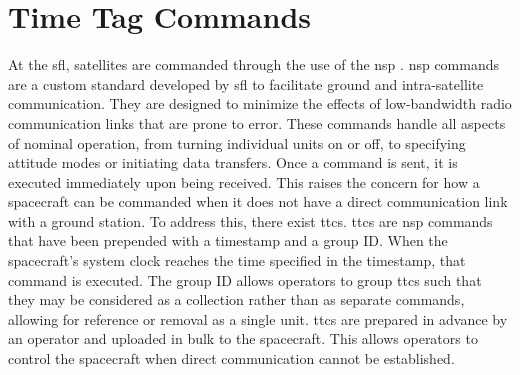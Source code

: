 \section{Time Tag Commands}

At the \gls{sfl}, satellites are commanded through the use of the \gls{nsp}
\cite{kekez_nanosatellite_2010}.  \gls{nsp} commands are a custom standard
developed by \gls{sfl} to facilitate ground and intra-satellite communication.
They are designed to minimize the effects of low-bandwidth radio communication
links that are prone to error.  These commands handle all aspects of nominal
operation, from turning individual units on or off, to specifying attitude
modes or initiating data transfers.  Once a command is sent, it is executed
immediately upon being received. This raises the concern for how a spacecraft
can be commanded when it does not have a direct communication link with a
ground station. To address this, there exist \glspl{ttc}.  \glspl{ttc} are
\gls{nsp} commands that have been prepended with a timestamp and a group ID.
When the spacecraft’s system clock reaches the time specified in the timestamp,
that command is executed.  The group ID allows operators to group \glspl{ttc}
such that they may be considered as a collection rather than as separate
commands, allowing for reference or removal as a single unit.  \glspl{ttc} are
prepared in advance by an operator and uploaded in bulk to the spacecraft.
This allows operators to control the spacecraft when direct communication
cannot be established.



